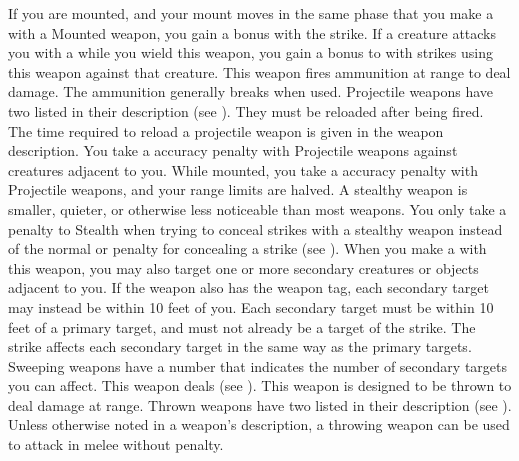         \label{Mounted Weapon} If you are mounted, and your mount moves in the same phase that you make a  with a Mounted weapon, you gain a   bonus with the strike.
         If a creature attacks you with a   while you wield this weapon, you  gain a  bonus to  with strikes using this weapon against that creature.
         This weapon fires ammunition at range to deal damage.
        The ammunition generally breaks when used.
        Projectile weapons have two  listed in their description (see ).
        They must be reloaded after being fired.
        The time required to reload a projectile weapon is given in the weapon description.
        You take a  accuracy penalty with Projectile weapons against creatures adjacent to you.
        While mounted, you take a  accuracy penalty with Projectile weapons, and your range limits are halved.
        A stealthy weapon is smaller, quieter, or otherwise less noticeable than most weapons.
        You only take a  penalty to Stealth when trying to conceal strikes with a stealthy weapon instead of the normal  or  penalty for concealing a strike (see ).
        \label{Sweeping} When you make a   with this weapon, you may also target one or more secondary creatures or objects adjacent to you.
        If the weapon also has the  weapon tag, each secondary target may instead be within 10 feet of you.
        Each secondary target must be within 10 feet of a primary target, and must not already be a target of the strike.
        The strike affects each secondary target in the same way as the primary targets.
        Sweeping weapons have a number that indicates the number of secondary targets you can affect.
         This weapon deals  (see ).
         This weapon is designed to be thrown to deal damage at range.
        Thrown weapons have two  listed in their description (see ).
        Unless otherwise noted in a weapon's description, a throwing weapon can be used to attack in melee without penalty.

